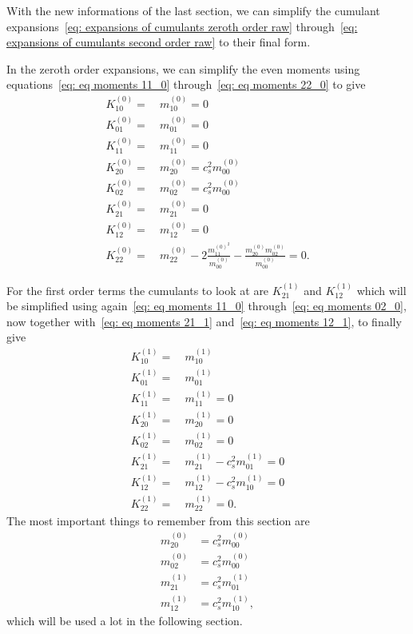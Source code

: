 With the new informations of the last section, we can simplify the cumulant expansions~\eqref{eq: expansions of cumulants zeroth order raw} through~\eqref{eq: expansions of cumulants second order raw} to their final form.

In the zeroth order expansions, we can simplify the even moments using equations~\eqref{eq: eq moments 11_0} through~\eqref{eq: eq moments 22_0} to give
\begin{equation}
  \label{eq: expansions of cumulants zeroth order}
  \begin{aligned}
    K_{10}^{(0)} =&\ m_{10}^{(0)} = 0\\
    K_{01}^{(0)} =&\ m_{01}^{(0)} = 0\\
    K_{11}^{(0)} =&\ m_{11}^{(0)} = 0\\
    K_{20}^{(0)} =&\ m_{20}^{(0)} = c_s^2 m_{00}^{(0)}\\
    K_{02}^{(0)} =&\ m_{02}^{(0)} = c_s^2 m_{00}^{(0)}\\
    K_{21}^{(0)} =&\ m_{21}^{(0)} = 0\\
    K_{12}^{(0)} =&\ m_{12}^{(0)} = 0\\
    K_{22}^{(0)} =&\ m_{22}^{(0)}
    - 2\frac{ m_{11}^{{(0)}^2}}{m_{00}^{(0)}}
    - \frac{ m_{20}^{(0)} m_{02}^{(0)} }{m_{00}^{(0)}}
    = 0.
  \end{aligned}
\end{equation}

For the first order terms the cumulants to look at are $K_{21}^{(1)}$ and $K_{12}^{(1)}$ which will be simplified using
again~\eqref{eq: eq moments 11_0} through~\eqref{eq: eq moments 02_0},
now together with~\eqref{eq: eq moments 21_1} and~\eqref{eq: eq moments 12_1}, to finally give
\begin{equation}
  \label{eq: expansions of cumulants first order}
  \begin{aligned}
    K_{10}^{(1)} =&\ m_{10}^{(1)}\\
    K_{01}^{(1)} =&\ m_{01}^{(1)}\\
    K_{11}^{(1)} =&\ m_{11}^{(1)} = 0 \\
    K_{20}^{(1)} =&\ m_{20}^{(1)} = 0\\
    K_{02}^{(1)} =&\ m_{02}^{(1)} = 0\\
    K_{21}^{(1)} =&\ m_{21}^{(1)}
    - c_s^2 m_{01}^{(1)} = 0 \\
    K_{12}^{(1)} =&\ m_{12}^{(1)}
    - c_s^2 m_{10}^{(1)} = 0 \\
    K_{22}^{(1)} =&\ m_{22}^{(1)} = 0.
  \end{aligned}
\end{equation}
The most important things to remember from this section are
\begin{equation}
  \label{eq: aliasing all}
  \begin{aligned}
    m_{20}^{(0)} &= c_s^2 m_{00}^{(0)} \\
    m_{02}^{(0)} &= c_s^2 m_{00}^{(0)} \\
    m_{21}^{(1)} &= c_s^2 m_{01}^{(1)} \\
    m_{12}^{(1)} &= c_s^2 m_{10}^{(1)},
  \end{aligned}
\end{equation}
which will be used a lot in the following section.

